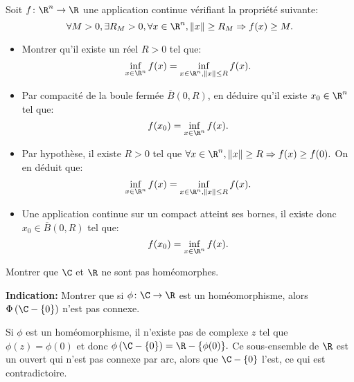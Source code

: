 \begin{fex}
    Soit $f \colon \R^n \to \R$ une application continue vérifiant la propriété suivante:
    \[
    \forall M > 0, \exists R_M > 0, \forall x \in \R^n, \| x \| \geq R_M \Rightarrow f(x) \geq M. 
    \]
    \begin{itemize}
        \item Montrer qu'il existe un réel $R > 0$ tel que:
        \[\inf_{x\in \R^n} f(x) = \inf_{x\in \R^n, \|x\| \leq R} f(x).\]
        \item Par compacité de la boule fermée $\overline{B}(0,R)$, en déduire qu'il existe $x_0 \in \R^n$ tel que:
        \[
        f(x_0) = \inf_{x\in \R^n} f(x).
        \]
    \end{itemize}
\end{fex}
\begin{itemize}
    \item  Par hypothèse, il existe $R> 0$ tel que $\forall x \in \R^n, \| x \| \geq R \Rightarrow f(x) \geq f(0).$ On en déduit que:
    \begin{equation}
        \inf_{x\in \R^n} f(x) = \inf_{x\in \R^n, \|x\| \leq R} f(x).
    \end{equation}
    \item Une application continue sur un compact atteint ses bornes, il existe donc $x_0 \in \overline{B}(0,R)$ tel que:
    \begin{equation}
        f(x_0) = \inf_{x\in \R^n} f(x).
    \end{equation}
\end{itemize}


\begin{fex}
   Montrer que $\C$ et $\R$ ne sont pas homéomorphes. 
    
    \textbf{Indication:} Montrer que si $\phi \colon \C \to \R$ est un homéomorphisme, alors $\Phi\left(\C-\{0\}\right)$ n'est pas connexe.    
\end{fex}
Si $\phi$ est un homéomorphisme, il n'existe pas de complexe $z$ tel que $\phi(z)=\phi(0)$ et donc
$\phi\left(\C - \{0\}\right)=\R-\{\phi(0)\}.$ Ce sous-ensemble de $\R$ est un ouvert qui n'est pas
connexe par arc, alors que $\C - \{0\}$ l'est, ce qui est contradictoire.
